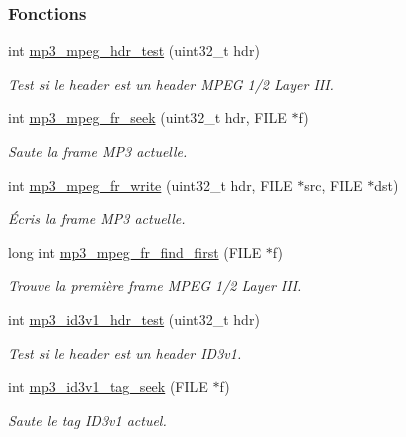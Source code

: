 \subsubsection*{Fonctions}
\begin{DoxyCompactItemize}
\item 
int \hyperlink{a00089_af03e7dddbda714ccda0efc124dcf7484}{mp3\+\_\+mpeg\+\_\+hdr\+\_\+test} (uint32\+\_\+t hdr)
\begin{DoxyCompactList}\small\item\em Test si le header est un header M\+P\+EG 1/2 Layer I\+II. \end{DoxyCompactList}\item 
int \hyperlink{a00089_aa1f3d4311fe8115981f98b79a1fea672}{mp3\+\_\+mpeg\+\_\+fr\+\_\+seek} (uint32\+\_\+t hdr, F\+I\+LE $\ast$f)
\begin{DoxyCompactList}\small\item\em Saute la frame M\+P3 actuelle. \end{DoxyCompactList}\item 
int \hyperlink{a00089_ab0198bd0d67c778ff7493f1bcd0a409e}{mp3\+\_\+mpeg\+\_\+fr\+\_\+write} (uint32\+\_\+t hdr, F\+I\+LE $\ast$src, F\+I\+LE $\ast$dst)
\begin{DoxyCompactList}\small\item\em Écris la frame M\+P3 actuelle. \end{DoxyCompactList}\item 
long int \hyperlink{a00089_afc3c44f7f4f0993fbc17c150c728e677}{mp3\+\_\+mpeg\+\_\+fr\+\_\+find\+\_\+first} (F\+I\+LE $\ast$f)
\begin{DoxyCompactList}\small\item\em Trouve la première frame M\+P\+EG 1/2 Layer I\+II. \end{DoxyCompactList}\item 
int \hyperlink{a00089_a7ebf97db66e0a6c9230536a642923cb5}{mp3\+\_\+id3v1\+\_\+hdr\+\_\+test} (uint32\+\_\+t hdr)
\begin{DoxyCompactList}\small\item\em Test si le header est un header I\+D3v1. \end{DoxyCompactList}\item 
int \hyperlink{a00089_ab0fd93a465f2e320e749093c17f20823}{mp3\+\_\+id3v1\+\_\+tag\+\_\+seek} (F\+I\+LE $\ast$f)
\begin{DoxyCompactList}\small\item\em Saute le tag I\+D3v1 actuel. \end{DoxyCompactList}\item 

\end{DoxyCompactItemize}
